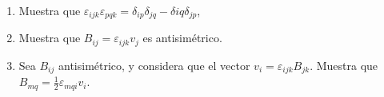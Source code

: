 \documentclass[../main.tex]{subfiles}
\begin{document}
\begin{problema}
	\begin{enumerate}
		\item Muestra que \(\varepsilon_{ijk}\varepsilon_{pqk} = \delta_{ip}\delta_{jq} - \delta{iq}\delta_{jp}\),
		\item Muestra que \(B_{ij} = \varepsilon_{ijk}v_{j}\) es antisimétrico.
		\item Sea \(B_{ij}\) antisimétrico, y considera que el vector \(v_{i} = \varepsilon_{ijk}B_{jk}\). Muestra que \(B_{mq} = \tfrac{1}{2}\varepsilon_{mqi}v_{i}\).
	\end{enumerate}
\end{problema}
\end{document}
